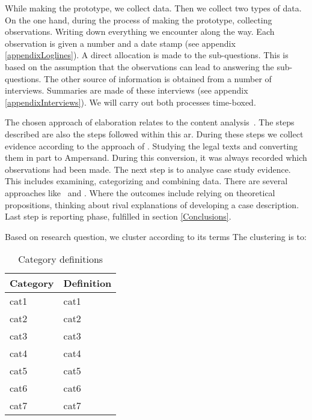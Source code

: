 While making the prototype, we collect data.
Then we collect two types of data.
On the one hand, during the process of making the prototype, collecting observations.
Writing down everything we encounter along the way.
Each observation is given a number and a date stamp (see appendix \ref{appendixLoglines}).
A direct allocation is made to the sub-questions.
This is based on the assumption that the observations can lead to answering the sub-questions.
The other source of information is obtained from a number of interviews.
Summaries are made of these interviews (see appendix \ref{appendixInterviews}).
We will carry out both processes time-boxed.


The chosen approach of elaboration relates to the content analysis~\citep{kohlbacher_use_2006}.
The steps described are also the steps followed within this \acrshort{ar}.
During these steps we collect evidence according to the approach of \cite{kohlbacher_use_2006} .
Studying the legal texts and converting them in part to Ampersand.
During this conversion, it was always recorded which observations had been made.
The next step is to analyse case study evidence.
This includes examining, categorizing and combining data.
There are several approaches like~\cite{hsieh_three_2005} and \cite{mayring_qualitative_2019}.
Where the outcomes include relying on theoretical propositions, thinking about rival explanations of developing a case description.
Last step is reporting phase, fulfilled in section \ref{Conclusions}.


Based on research question, we cluster according to its terms
The clustering is to:
\begin{table}[H]
    \caption{Category definitions}
    \begin{tabularx}{\linewidth}{|X|X|}
    \hline
        \textbf{Category} & \textbf{Definition} \\\hline
        \acrshort{cat1} & \acrlong{cat1} \\\hline
        \acrshort{cat2} & \acrlong{cat2} \\\hline
        \acrshort{cat3} & \acrlong{cat3} \\\hline
        \acrshort{cat4} & \acrlong{cat4} \\\hline
        \acrshort{cat5} & \acrlong{cat5} \\\hline
        \acrshort{cat6} & \acrlong{cat6} \\\hline
        \acrshort{cat7} & \acrlong{cat7} \\\hline
    \end{tabularx}
    \label{tab:Category_definitions}
\end{table}

